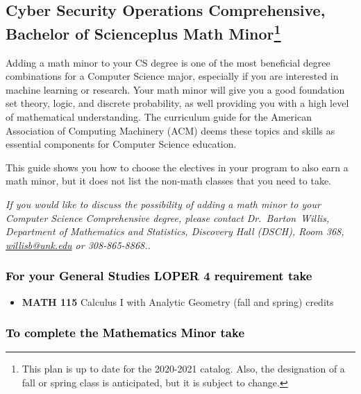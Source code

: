 \documentclass[10pt]{article}
\makeatletter
\newcommand{\calcone}{\textbf{MATH 115} Calculus I with Analytic Geometry (fall and spring) \dotfill 5 credits}
\newcommand{\contactbw}{\mbox{Dr.\ Barton Willis}, Department of Mathematics and Statistics,  Discovery Hall (DSCH), Room 368,
\href{mailto:willisb@unk.edu}{willisb@unk.edu} or 308-865-8868.}
\makeatother
\begin{document}
\subsection*{\textbf{\textcolor{unkblue}{Cyber Security Operations Comprehensive, Bachelor of Scienceplus Math Minor\footnote[1]{This plan is up to date for the 2020-2021 catalog. Also, the designation of a fall or spring class is anticipated, but it is subject to change.
}}}}


Adding a math minor to your CS degree is one of the most beneficial degree combinations for a Computer Science major, especially if you are interested in machine learning or research.  Your math minor will give you a good foundation set theory, logic, and discrete probability, as well providing you with a high level of mathematical understanding.
The curriculum guide for the American Association of Computing Machinery (ACM) deems  these topics and skills  as essential components for  Computer Science education.

 This guide shows you how to choose the electives in your program to also earn a math minor, but it does not list the non-math classes that you need to take.

 \textcolor{unkblue}{\emph{If you would like to discuss the possibility of  adding a math minor to your Computer Science Comprehensive degree, please contact \contactbw.}}

\vspace{-0.1in}

\subsubsection*{\textcolor{black}{For  your General Studies LOPER 4 requirement take}}
\begin{itemize}
\item  \calcone
\end{itemize}

\subsubsection*{\textcolor{black}{To complete the Mathematics Minor take}}
\end{document}
